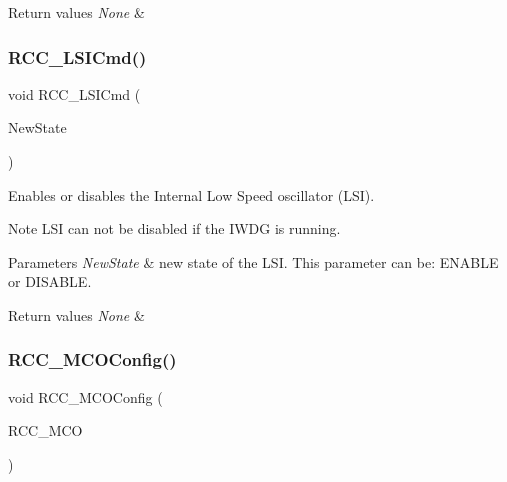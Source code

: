 \begin{DoxyRetVals}{Return values}
{\em None} & \\
\hline
\end{DoxyRetVals}
\mbox{\label{group___r_c_c___exported___functions_ga81e3ca29fd154ac2019bba6936d6d5ed}} 
\subsubsection{\texorpdfstring{RCC\_LSICmd()}{RCC\_LSICmd()}}
{\footnotesize\ttfamily void R\+C\+C\+\_\+\+L\+S\+I\+Cmd (\begin{DoxyParamCaption}\item[{\mbox{\hyperlink{group___exported__types_gac9a7e9a35d2513ec15c3b537aaa4fba1}{Functional\+State}}}]{New\+State }\end{DoxyParamCaption})}



Enables or disables the Internal Low Speed oscillator (L\+SI). 

\begin{DoxyNote}{Note}
L\+SI can not be disabled if the I\+W\+DG is running. 
\end{DoxyNote}

\begin{DoxyParams}{Parameters}
{\em New\+State} & new state of the L\+SI. This parameter can be\+: E\+N\+A\+B\+LE or D\+I\+S\+A\+B\+LE. \\
\hline
\end{DoxyParams}

\begin{DoxyRetVals}{Return values}
{\em None} & \\
\hline
\end{DoxyRetVals}
\mbox{\label{group___r_c_c___exported___functions_ga8f62b86c6ca8ae6585ba1cec79431fe5}} 
\subsubsection{\texorpdfstring{RCC\_MCOConfig()}{RCC\_MCOConfig()}}
{\footnotesize\ttfamily void R\+C\+C\+\_\+\+M\+C\+O\+Config (\begin{DoxyParamCaption}\item[{uint8\+\_\+t}]{R\+C\+C\+\_\+\+M\+CO }\end{DoxyParamCaption})}



